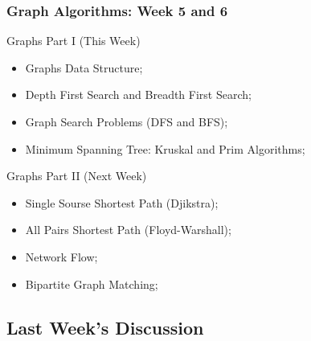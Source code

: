 \begin{frame}
  \frametitle{Graph Algorithms: Week 5 and 6}
  \begin{block}{Graphs Part I (This Week)}
    \begin{itemize}
    \item Graphs Data Structure;
    \item Depth First Search and Breadth First Search;
    \item Graph Search Problems (DFS and BFS);
    \item Minimum Spanning Tree: Kruskal and Prim Algorithms;
    \end{itemize}
  \end{block}
  \begin{block}{Graphs Part II (Next Week)}
    \begin{itemize}
    \item Single Sourse Shortest Path (Djikstra);
    \item All Pairs Shortest Path (Floyd-Warshall);
    \item Network Flow;
    \item Bipartite Graph Matching;
    \end{itemize}
  \end{block}
\end{frame}


\subsection{Last Week's Discussion}
